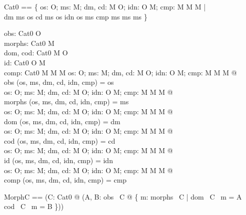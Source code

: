 \begin{zed}
Cat0 == \{  os: \power  O; ms: \power  M; dm, cd: M \fun  O; idn: O \pfun  M; cmp: M \cross  M \pfun  M | \\ \quad 
 dm \in  ms \fun  os \land  cd \in  ms \fun  os \land  idn \in  os \fun  ms \land  cmp \in  ms \cross  ms \fun  ms \}
\end{zed}

\begin{axdef}
  obs: Cat0 \fun  \power  O\\
  morphs: Cat0 \fun  \power  M\\
  dom, cod: Cat0 \fun  M \pfun  O\\
  id: Cat0 \pfun  O \pfun  M\\
  comp: Cat0 \pfun  M \cross  M \pfun  M
\where
  \forall  os: \power  O; ms: \power  M; dm, cd: M \fun  O; idn: O \pfun  M; cmp: M \cross  M \pfun  M @ \\ \quad 
   obs (os, ms, dm, cd, idn, cmp) = os\\
  \forall  os: \power  O; ms: \power  M; dm, cd: M \fun  O; idn: O \pfun  M; cmp: M \cross  M \pfun  M @ \\ \quad 
  morphs (os, ms, dm, cd, idn, cmp) = ms\\
  \forall  os: \power  O; ms: \power  M; dm, cd: M \fun  O; idn: O \pfun  M; cmp: M \cross  M \pfun  M @ \\ \quad 
  dom (os, ms, dm, cd, idn, cmp) = dm\\
  \forall  os: \power  O; ms: \power  M; dm, cd: M \fun  O; idn: O \pfun  M; cmp: M \cross  M \pfun  M @ \\ \quad 
   cod (os, ms, dm, cd, idn, cmp) = cd\\
  \forall  os: \power  O; ms: \power  M; dm, cd: M \fun  O; idn: O \pfun  M; cmp: M \cross  M \pfun  M @ \\ \quad 
  id (os, ms, dm, cd, idn, cmp) = idn\\
  \forall  os: \power  O; ms: \power  M; dm, cd: M \fun  O; idn: O \pfun  M; cmp: M \cross  M \pfun  M @ \\ \quad 
   comp (os, ms, dm, cd, idn, cmp) = cmp
\end{axdef}

\begin{zed}
MorphC == (\lambda  C: Cat0 @ (\lambda  A, B: obs~ C @ \{  m: morphs~ C | dom~ C~ m = A \land  cod~ C~ m = B \}))
\end{zed}


